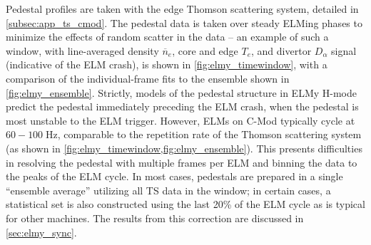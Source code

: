 Pedestal profiles are taken with the edge Thomson scattering system, detailed in \cref{subsec:app_ts_cmod}.  The pedestal data is taken over steady ELMing phases to minimize the effects of random scatter in the data -- an example of such a window, with line-averaged density $\overline{n}_e$, core and edge $T_e$, and divertor $D_\alpha$ signal (indicative of the ELM crash), is shown in \cref{fig:elmy_timewindow}, with a comparison of the individual-frame fits to the ensemble shown in \cref{fig:elmy_ensemble}.  Strictly, models of the pedestal structure in ELMy H-mode predict the pedestal immediately preceding the ELM crash, when the pedestal is most unstable to the ELM trigger.  However, ELMs on C-Mod typically cycle at $60-100 \;\si{\hertz}$, comparable to the repetition rate of the Thomson scattering system (as shown in \cref{fig:elmy_timewindow,fig:elmy_ensemble}).  This presents difficulties in resolving the pedestal with multiple frames per ELM and binning the data to the peaks of the ELM cycle.  In most 
cases, pedestals are prepared in a single ``ensemble average'' utilizing all TS data in the window; in certain cases, a statistical set is also constructed using the last 20\% of the ELM cycle as is typical for other machines.  The results from this correction are discussed in \cref{sec:elmy_sync}.

\begin{figure}
 \pushtooutside
\end{figure}

